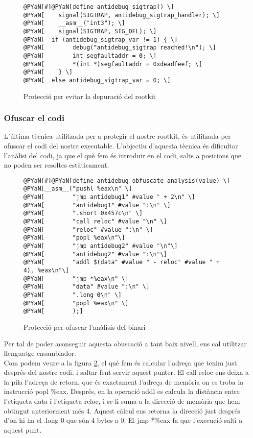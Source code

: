 \begin{figure}[h!]
\begin{Verbatim}[commandchars=@\[\]]
@PYaN[#]@PYaN[define antidebug_sigtrap() \]
@PYaN[    signal(SIGTRAP, antidebug_sigtrap_handler); \]
@PYaN[    __asm__("int3"); \]
@PYaN[    signal(SIGTRAP, SIG_DFL); \]
@PYaN[	if (antidebug_sigtrap_var != 1) { \]
@PYaN[        debug("antidebug_sigtrap reached!\n"); \]
@PYaN[        int segfaultaddr = 0; \]
@PYaN[        *(int *)segfaultaddr = 0xdeadfeef; \]
@PYaN[    } \]
@PYaN[	else antidebug_sigtrap_var = 0; \]
\end{Verbatim}
\caption{Protecció per evitar la depuració del rootkit}
\label{fig:antidebug_set_sigtrap}
\end{figure}

\subsubsection{Ofuscar el codi}
L'última tècnica utilitzada per a protegir el nostre rootkit, és utilitzada per ofuscar el codi del nostre
executable. L'objectiu d'aquesta tècnica és dificultar l'anàlisi del codi, ja que el què fem és introduir
en el codi, salts a posicions que no poden ser resoltes estàticament.  \\

\begin{figure}[h!]
\begin{Verbatim}[commandchars=@\[\]]
@PYaN[#]@PYaN[define antidebug_obfuscate_analysis(value) \]
@PYaN[__asm__("pushl %eax\n" \]
@PYaN[        "jmp antidebug1" #value " + 2\n" \]
@PYaN[        "antidebug1" #value ":\n" \]
@PYaN[        ".short 0x457c\n" \]
@PYaN[        "call reloc" #value "\n" \]
@PYaN[        "reloc" #value ":\n" \]
@PYaN[        "popl %eax\n"\]
@PYaN[        "jmp antidebug2" #value "\n"\]
@PYaN[        "antidebug2" #value ":\n"\]
@PYaN[        "addl $(data" #value " - reloc" #value " + 4), %eax\n"\]
@PYaN[        "jmp *%eax\n" \]
@PYaN[        "data" #value ":\n" \]
@PYaN[        ".long 0\n" \]
@PYaN[        "popl %eax\n" \]
@PYaN[        );]
\end{Verbatim}
\caption{Protecció per ofuscar l'anàlisis del binari}
\label{fig:antidebug_obfuscate}
\end{figure}

Per tal de poder aconseguir aquesta obuscació a tant baix nivell, ens cal utilitzar llenguatge ensamblador. \\

Com podem veure a la figura \ref{fig:antidebug_obfuscate}, el què fem és calcular l'adreça que tenim just 
després del nostre codi, i saltar fent servir aquest punter. El call reloc ens deixa a la pila l'adreça de 
retorn, que és exactament l'adreça de memòria on es troba la instrucció popl \%eax. Després, en la operació
addl es calcula la distància entre l'etiqueta data i l'etiqueta reloc, i se li suma a la direcció de memòria
que hem obtingut anteriorment més 4. Aquest càlcul ens retorna la direcció just després d'on hi ha el .long 0 
que són 4 bytes a 0. El jmp *\%eax fa que l'execució salti a aquest punt. \\

